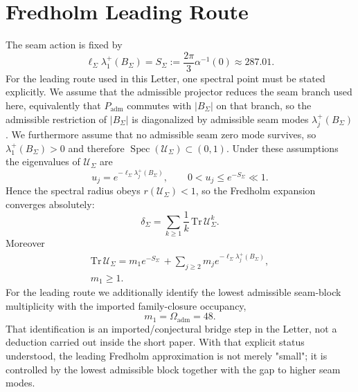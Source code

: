 \documentclass[aps,prl,reprint,superscriptaddress,longbibliography,nofootinbib,floatfix]{revtex4-2}
\newcommand{\Padm}{P_{\mathrm{adm}}}
\newcommand{\Oadm}{\Omega_{\mathrm{adm}}}
\newcommand{\Seam}{\Sigma}
\newcommand{\USeam}{\mathcal U_{\Seam}}
\begin{document}
\section{Fredholm Leading Route}

The seam action is fixed by
\begin{equation}
\ell_{\Seam}\lambda_1^+(B_{\Seam})
=
S_{\Seam}
:=
\frac{2\pi}{3}\alpha^{-1}(0)
\approx
287.01.
\label{eq:seam-action}
\end{equation}
For the leading route used in this Letter, one spectral point must be stated explicitly. We assume that the admissible projector reduces the seam branch used here, equivalently that $\Padm$ commutes with $|B_{\Seam}|$ on that branch, so the admissible restriction of $|B_{\Seam}|$ is diagonalized by admissible seam modes $\lambda_j^+(B_{\Seam})$. We furthermore assume that no admissible seam zero mode survives, so $\lambda_1^+(B_{\Seam})>0$ and therefore $\operatorname{Spec}(\USeam)\subset(0,1)$. Under these assumptions the eigenvalues of $\USeam$ are
\[
u_j=e^{-\ell_{\Seam}\lambda_j^+(B_{\Seam})},
\qquad
0<u_j\le e^{-S_{\Seam}}\ll1.
\]
Hence the spectral radius obeys $r(\USeam)<1$, so the Fredholm expansion converges absolutely:
\begin{equation}
\delta_{\Seam}
=
\sum_{k\ge1}\frac{1}{k}\,\mathrm{Tr}\,\USeam^k.
\label{eq:fredholm-expansion}
\end{equation}
Moreover
\begin{equation}
\begin{aligned}
\mathrm{Tr}\,\USeam
=
m_1e^{-S_{\Seam}}
\,+\!\!\sum_{j\ge2}m_j e^{-\ell_{\Seam}\lambda_j^+(B_{\Seam})},\\
m_1\ge1.
\end{aligned}
\label{eq:trace-split}
\end{equation}
For the leading route we additionally identify the lowest admissible seam-block multiplicity with the imported family-closure occupancy,
\[
m_1=\Oadm=48.
\]
That identification is an imported/conjectural bridge step in the Letter, not a deduction carried out inside the short paper. With that explicit status understood, the leading Fredholm approximation is not merely "small"; it is controlled by the lowest admissible block together with the gap to higher seam modes.
\end{document}
